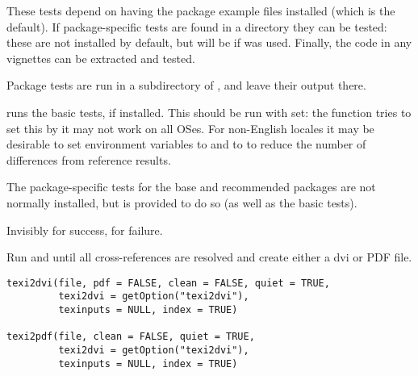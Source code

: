 %
\begin{Details}\relax
These tests depend on having the package example files installed (which
is the default).  If package-specific tests are found in a
 directory they can be tested: these are not
installed by default, but will be if
 was used.  Finally, the \R{}
code in any vignettes can be extracted and tested.

Package tests are run in a  subdirectory of
, and leave their output there.

 runs the basic tests, if installed.  This
should be run with  set: the function tries to set
this by it may not work on all OSes.  For non-English locales it may
be desirable to set environment variables  to 
and  to  to reduce the number of differences from
reference results.

The package-specific tests for the base and recommended packages are
not normally installed, but  is provided
to do so (as well as the basic tests).
\end{Details}
%
\begin{Value}
Invisibly  for success,  for failure.
\end{Value}
%
\begin{Description}\relax
Run  and  until all cross-references are
resolved and create either a dvi or PDF file.
\end{Description}
%
\begin{Usage}
\begin{verbatim}
texi2dvi(file, pdf = FALSE, clean = FALSE, quiet = TRUE,
         texi2dvi = getOption("texi2dvi"),
         texinputs = NULL, index = TRUE)

texi2pdf(file, clean = FALSE, quiet = TRUE,
         texi2dvi = getOption("texi2dvi"),
         texinputs = NULL, index = TRUE)
\end{verbatim}
\end{Usage}
%
